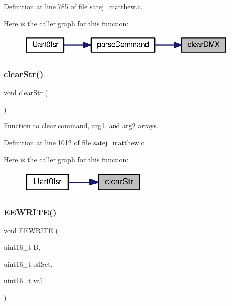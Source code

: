 Definition at line \mbox{\hyperlink{satej__matthew_8c_source_l00785}{785}} of file \mbox{\hyperlink{satej__matthew_8c_source}{satej\+\_\+matthew.\+c}}.

Here is the caller graph for this function\+:
\nopagebreak
\begin{figure}[H]
\begin{center}
\leavevmode
\includegraphics[width=309pt]{satej__matthew_8c_a90f05ed3280bc7f2e971ed7216028960_icgraph}
\end{center}
\end{figure}
\mbox{\label{satej__matthew_8c_a595edd7ef79a70fc4dccbca4b2cf0deb}} 
\subsubsection{\texorpdfstring{clearStr()}{clearStr()}}
{\footnotesize\ttfamily void clear\+Str (\begin{DoxyParamCaption}{ }\end{DoxyParamCaption})}



Function to clear command, arg1, and arg2 arrays. 



Definition at line \mbox{\hyperlink{satej__matthew_8c_source_l01012}{1012}} of file \mbox{\hyperlink{satej__matthew_8c_source}{satej\+\_\+matthew.\+c}}.

Here is the caller graph for this function\+:
\nopagebreak
\begin{figure}[H]
\begin{center}
\leavevmode
\includegraphics[width=180pt]{satej__matthew_8c_a595edd7ef79a70fc4dccbca4b2cf0deb_icgraph}
\end{center}
\end{figure}
\mbox{\label{satej__matthew_8c_a31b9c21cfe092a5574eb605046951401}} 
\subsubsection{\texorpdfstring{EEWRITE()}{EEWRITE()}}
{\footnotesize\ttfamily void E\+E\+W\+R\+I\+TE (\begin{DoxyParamCaption}\item[{uint16\+\_\+t}]{B,  }\item[{uint16\+\_\+t}]{off\+Set,  }\item[{uint16\+\_\+t}]{val }\end{DoxyParamCaption})}



